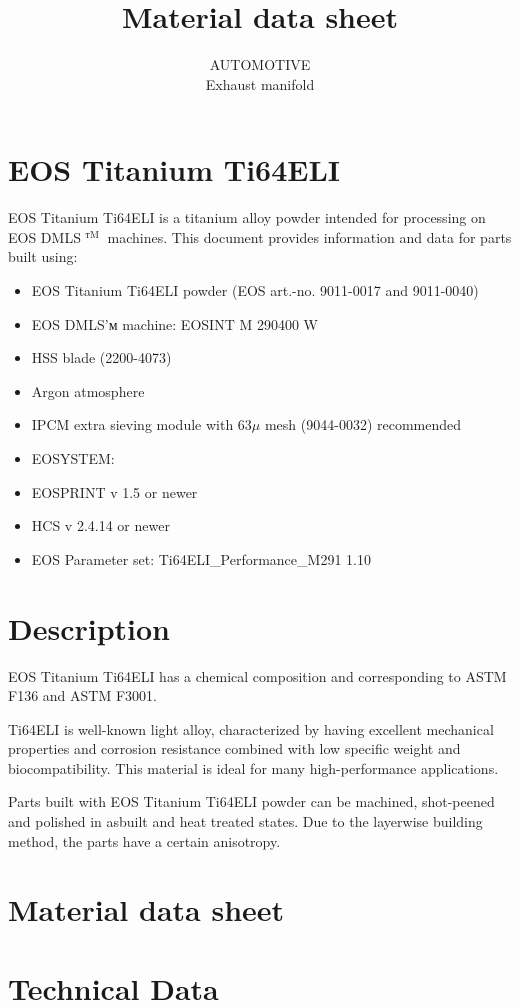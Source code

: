 \documentclass[10pt]{article}
\title{Material data sheet }
\author{AUTOMOTIVE\\
Exhaust manifold}
\date{}
\begin{document}
\maketitle
\section*{EOS Titanium Ti64ELI}
EOS Titanium Ti64ELI is a titanium alloy powder intended for processing on EOS DMLS ${ }^{\text {тM }}$ machines. This document provides information and data for parts built using:

\begin{itemize}
  \item EOS Titanium Ti64ELI powder (EOS art.-no. 9011-0017 and 9011-0040)
  \item EOS DMLS'м machine: EOSINT M 290400 W
  \item HSS blade (2200-4073)
  \item Argon atmosphere
  \item IPCM extra sieving module with $63 \mu$ mesh (9044-0032) recommended
  \item EOSYSTEM:
  \item EOSPRINT v 1.5 or newer
  \item HCS v 2.4.14 or newer
  \item EOS Parameter set: Ti64ELI\_Performance\_M291 1.10
\end{itemize}

\section*{Description}
EOS Titanium Ti64ELI has a chemical composition and corresponding to ASTM F136 and ASTM F3001.

Ti64ELI is well-known light alloy, characterized by having excellent mechanical properties and corrosion resistance combined with low specific weight and biocompatibility. This material is ideal for many high-performance applications.

Parts built with EOS Titanium Ti64ELI powder can be machined, shot-peened and polished in asbuilt and heat treated states. Due to the layerwise building method, the parts have a certain anisotropy.

\section*{Material data sheet}
\section*{Technical Data}
\end{document}
